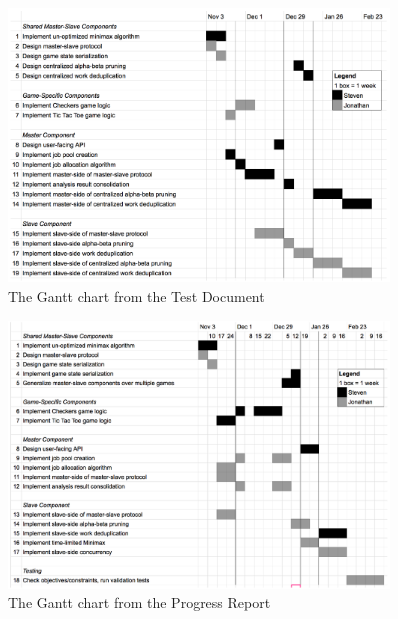 \documentclass[pdftex,12pt,a4paper]{article}
\begin{document}
\begin{figure}[H]
\begin{center}
\includegraphics[width=0.9\textwidth]{img/gantt-test}
\caption{The Gantt chart from the Test Document}
\end{center}
\end{figure}

\begin{figure}[H]
\begin{center}
\includegraphics[width=0.9\textwidth]{img/gantt-progress}
\caption{The Gantt chart from the Progress Report}
\end{center}
\end{figure}
\end{document}
